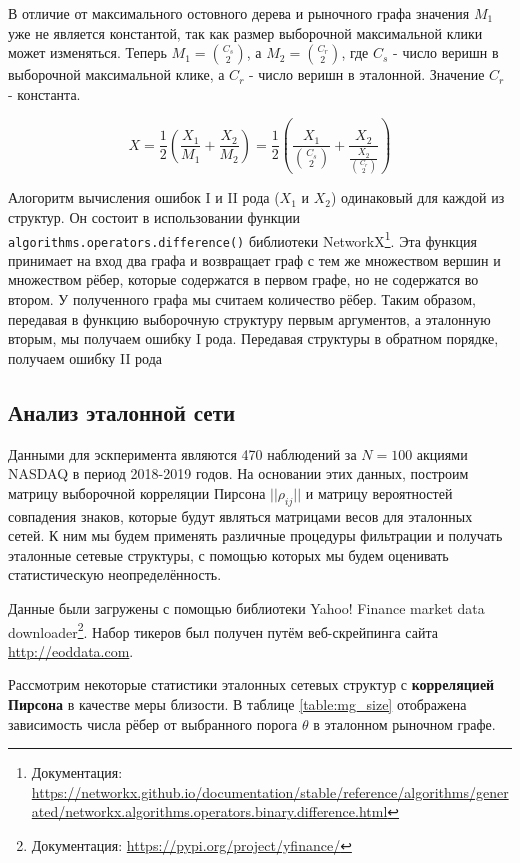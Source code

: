 В отличие от максимального остовного дерева и рыночного графа значения $M_1$ уже не является константой, так как размер выборочной максимальной клики может изменяться. Теперь $M_1 = \binom{C_s}{2}$, а $M_2 = \binom{C_r}{2}$, где $C_s$ - число веришн в выборочной максимальной клике, а $C_r$ - число веришн в эталонной. Значение $C_r$ - константа.

\begin{equation}
X = \frac{1}{2}\left(\frac{X_1}{M_1} + \frac{X_2}{M_2}\right) = \frac{1}{2}\left(\frac{X_1}{\binom{C_s}{2}} + \frac{X_2}{\frac{X_2}{\binom{C_r}{2}}}\right)
\end{equation}


Алогоритм вычисления ошибок I и II рода ($X_1$ и $X_2$) одинаковый для каждой из структур. Он состоит в использовании функции  \verb|algorithms.operators.difference()| библиотеки NetworkX\footnote{Документация: \url{https://networkx.github.io/documentation/stable/reference/algorithms/generated/networkx.algorithms.operators.binary.difference.html}}. Эта функция принимает на вход два графа и возвращает граф с тем же множеством вершин  и множеством рёбер, которые содержатся в первом графе, но не содержатся во втором. У полученного графа мы считаем количество рёбер. Таким образом, передавая в функцию выборочную структуру первым аргументов, а эталонную вторым, мы получаем ошибку I рода. Передавая структуры в обратном порядке, получаем ошибку II рода


\subsection{Анализ эталонной сети}

Данными для эскперимента являются 470 наблюдений за $N=100$ акциями NASDAQ в период 2018-2019 годов. На основании этих данных, построим матрицу выборочной корреляции Пирсона $||\rho_{i j}||$ и матрицу вероятностей совпадения знаков, которые будут являться матрицами весов для эталонных сетей. К ним мы будем применять различные процедуры фильтрации и получать эталонные сетевые структуры, с помощью которых мы будем оценивать статистическую неопределённость.

Данные были загружены с помощью библиотеки Yahoo! Finance market data downloader\footnote{Документация: \url{https://pypi.org/project/yfinance/}}. Набор тикеров был получен путём веб-скрейпинга сайта \url{http://eoddata.com}.

Рассмотрим некоторые статистики эталонных сетевых структур с\textbf{ корреляцией Пирсона} в качестве меры близости. В таблице \ref{table:mg_size} отображена зависимость числа рёбер от выбранного порога $\theta$ в эталонном рыночном графе.

